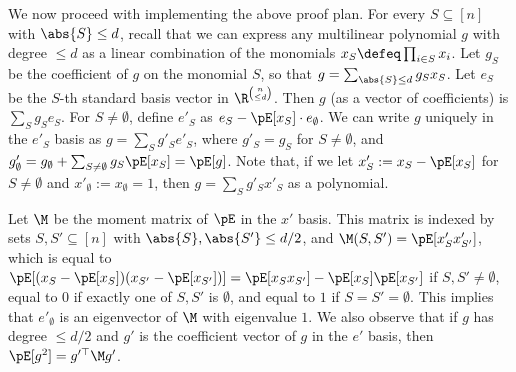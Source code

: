 We now proceed with implementing the above proof plan. For every $S \subseteq [n]$ with $\abs{S} \leq d$, recall that we can express any multilinear polynomial $g$ with degree $\leq d$ as a linear combination of the monomials $x_S \defeq \prod_{i \in S} x_i$. Let $g_S$ be the coefficient of $g$ on the monomial $S$, so that $g = \sum_{\abs{S} \leq d} g_S x_S$. Let $e_S$ be the $S$-th standard basis vector in $\R^{{n \choose \leq d}}$. Then $g$ (as a vector of coefficients) is $\sum_{S} g_S e_S$. For $S \ne \emptyset$, define $e'_S$ as $e_S - \pE[x_S] \cdot e_{\emptyset}$. We can write $g$ uniquely in the $e'_S$ basis as $g = \sum_{S} g'_S e'_S$, where $g'_S = g_S$ for $S \ne \emptyset$, and $g'_{\emptyset} = g_{\emptyset} + \sum_{S \ne \emptyset} g_S \pE[x_S] = \pE[g]$.
Note that, if we let $x'_S := x_S - \pE[x_S]$ for $S \ne \emptyset$ and $x'_{\emptyset} := x_{\emptyset} = 1$, then $g = \sum_{S} g'_S x'_S$ as a polynomial.

Let $\M$ be the moment matrix of $\pE$ in the $x'$ basis. This matrix is indexed by sets $S, S' \subseteq [n]$ with $\abs{S}, \abs{S'} \leq d/2$, and $\M(S,S') = \pE[x'_S x'_{S'}]$, which is equal to $\pE[(x_S - \pE[x_S])(x_{S'} - \pE[x_{S'}])] = \pE[x_S x_{S'}] - \pE[x_S]\pE[x_{S'}]$ if $S,S' \ne \emptyset$, equal to $0$ if exactly one of $S,S'$ is $\emptyset$, and equal to $1$ if $S = S' = \emptyset$. This implies that $e'_{\emptyset}$ is an eigenvector of $\M$ with eigenvalue $1$. We also observe that if $g$ has degree $\leq d/2$ and $g'$ is the coefficient vector of $g$ in the $e'$ basis, then $\pE[g^2] = g'^{\top} \M g'$.

